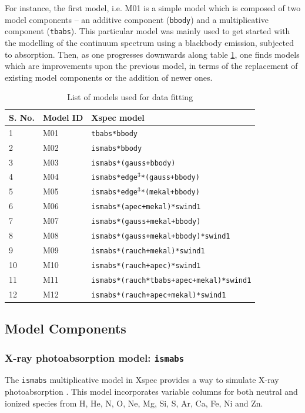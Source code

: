 		For instance, the first model, i.e. M01 is a simple model which is composed of two model components -- an additive component (\texttt{bbody}) and a multiplicative component (\texttt{tbabs}). This particular model was mainly used to get started with the modelling of the continuum spectrum using a blackbody emission, subjected to absorption. Then, as one progresses downwards along table \ref{xmm-rgs-model-list}, one finds models which are improvements upon the previous model, in terms of the replacement of existing model components or the addition of newer ones.
		\begin{table}[h!]
			\centering
			\caption{List of models used for data fitting}
			\label{xmm-rgs-model-list}
			\begin{tabular}{|l|l|l|}
				\hline
				\textbf{S. No.} & \textbf{Model ID} & \textbf{Xspec model} \\ \hline
				{1} & {M01} & \texttt{tbabs*bbody} \\ \hline
				{2} & {M02} & \texttt{ismabs*bbody} \\ \hline
				{3} & {M03} & \texttt{ismabs*(gauss+bbody)} \\ \hline
				{4} & {M04} & \texttt{ismabs*edge$^3$*(gauss+bbody)} \\ \hline
				{5} & {M05} & \texttt{ismabs*edge$^3$*(mekal+bbody)} \\ \hline
				{6} & {M06} & \texttt{ismabs*(apec+mekal)*swind1} \\ \hline
				{7} & {M07} & \texttt{ismabs*(gauss+mekal+bbody)} \\ \hline
				{8} & {M08} & \texttt{ismabs*(gauss+mekal+bbody)*swind1} \\ \hline
				{9} & {M09} & \texttt{ismabs*(rauch+mekal)*swind1} \\ \hline
				{10} & {M10} & \texttt{ismabs*(rauch+apec)*swind1} \\ \hline
				{11} & {M11} & \texttt{ismabs*(rauch*tbabs+apec+mekal)*swind1} \\ \hline
				{12} & {M12} & \texttt{ismabs*(rauch+apec+mekal)*swind1} \\ \hline
			\end{tabular}
		\end{table}
	
		\subsection{Model Components} \label{hi-resolution:models:components}
		
			\subsubsection{X-ray photoabsorption model: \texttt{ismabs}}
			The \texttt{ismabs} multiplicative model in Xspec provides a way to simulate X-ray photoabsorption \cite{ismabs_gatuzz}. This model incorporates variable columns for both neutral and ionized species from H, He, N, O, Ne, Mg, Si, S, Ar, Ca, Fe, Ni and Zn.
			
